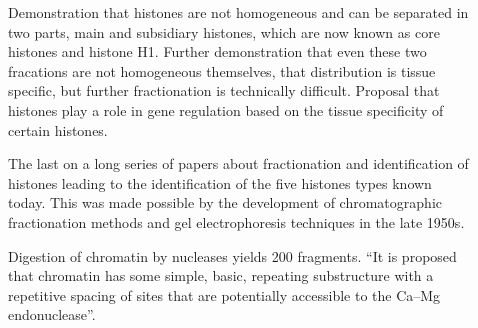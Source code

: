 \begin{description}
        \item[\cite{stedman1951main-histones-separation}]
        Demonstration that histones are not homogeneous and can be
        separated in two parts, main and subsidiary histones,
        which are now known as core histones and histone H1.
        Further demonstration that even these two fracations are not
        homogeneous themselves, that distribution is tissue specific,
        but further fractionation is technically difficult.
        Proposal that histones play a role in gene regulation based
        on the tissue specificity of certain histones.

        \item[\cite{philips-and-johns1965-fractionation}]
        The last on a long series of papers about fractionation and
        identification of histones leading to the identification of
        the five histones types known today.
        This was made possible by the development of chromatographic
        fractionation methods and gel electrophoresis techniques in the
        late 1950s.

        \item[\cite{hewish1973-200bp-pieces}]
        Digestion of chromatin by nucleases yields \SI{200}{\bp}
        fragments.
        ``It is proposed that chromatin has some simple, basic, repeating
        substructure with a repetitive spacing of sites that are
        potentially accessible to the Ca--Mg endonuclease''.


\end{description}
